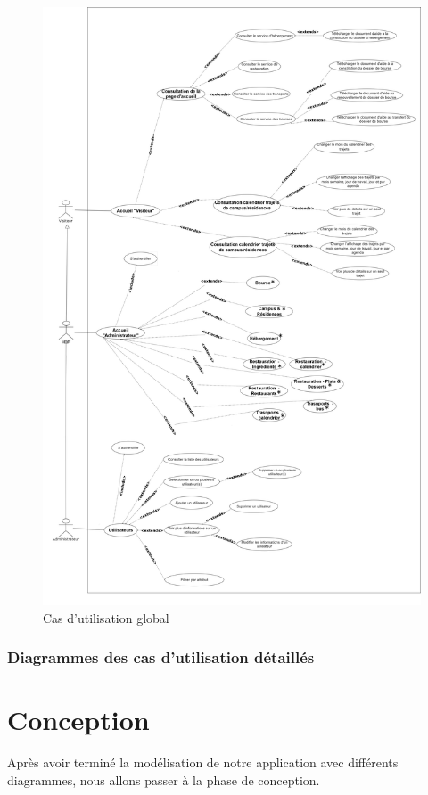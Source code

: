 \begin{figure}[H]
    \centering
    \includegraphics[scale=0.078]{ACR/Diagrammes/Global (1).jpg}
    \caption{Cas d'utilisation global}
\end{figure}

\subsubsection{Diagrammes des cas d’utilisation détaillés}


\section{Conception}
Après avoir terminé la modélisation de notre application avec différents diagrammes, nous allons passer à la phase de conception.\\

